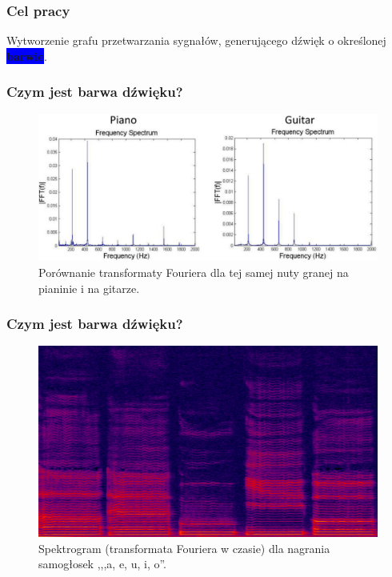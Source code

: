 \documentclass[]{beamer}
\begin{document}
\begin{frame}
  \frametitle{Cel pracy}

  \centering
  \Large
    Wytworzenie grafu przetwarzania sygnałów, generującego dźwięk o określonej \colorbox{blue}{\color{white}\textbf{barwie}}.
\end{frame}


\begin{frame}
  \frametitle{Czym jest \textbf{barwa} dźwięku?}
  \begin{figure}
    \centering
    \includegraphics[width=0.9\linewidth]{piano_guitar_fourier.png}
    \caption{Porównanie transformaty Fouriera dla tej samej nuty granej na pianinie i na gitarze.}
  \end{figure}
\end{frame}

\begin{frame}
  \frametitle{Czym jest \textbf{barwa} dźwięku?}
  \begin{figure}
    \centering
    \includegraphics[width=0.9\linewidth]{aeuio_spectrogram.png}
    \caption{Spektrogram (transformata Fouriera w czasie) dla nagrania samogłosek ,,,a, e, u, i, o''.}
  \end{figure}
\end{frame}
\end{document}
